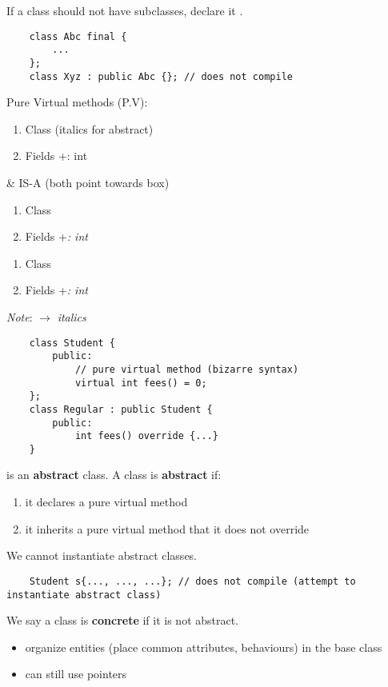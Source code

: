 If a class should not have subclasses, declare it .
\begin{lstlisting}
    class Abc final {
        ...
    };
    class Xyz : public Abc {}; // does not compile
\end{lstlisting}

Pure Virtual methods (P.V):
\begin{enumerate}[(1)]
    \item Class
          \subitem \emph{} (italics for abstract)
    \item Fields
          \subitem +: int
\end{enumerate}

 \&  IS-A  (both point towards  box)
\begin{enumerate}[(1)]
    \item Class
          \subitem {}
    \item Fields
          \subitem +\emph{: int}
\end{enumerate}

\begin{enumerate}[(1)]
    \item Class
          \subitem {}
    \item Fields
          \subitem +\emph{: int}
\end{enumerate}

\emph{Note}:  $ \rightarrow $ \emph{italics}

\begin{lstlisting}
    class Student {
        public:
            // pure virtual method (bizarre syntax)
            virtual int fees() = 0;
    };
    class Regular : public Student {
        public:
            int fees() override {...}
    }
\end{lstlisting}

 is an \textbf{abstract} class. A class is \textbf{abstract}
if:
\begin{enumerate}[(1)]
    \item it declares a pure virtual method
    \item it inherits a pure virtual method that it does not override
\end{enumerate}
We cannot instantiate abstract classes.
\begin{lstlisting}
    Student s{..., ..., ...}; // does not compile (attempt to instantiate abstract class)
\end{lstlisting}
We say a class is \textbf{concrete} if it is not abstract.
\begin{itemize}
    \item organize entities (place common attributes, behaviours)
          in the base class
    \item can still use  pointers
    \subitem {}
\end{itemize}
